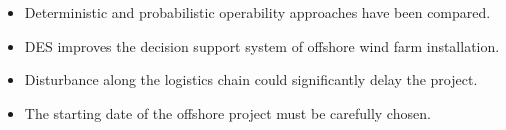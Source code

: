 \begin{highlights}
    \begin{itemize}
        \item Deterministic and probabilistic operability approaches have been compared.
        \item DES improves the decision support system of offshore wind farm installation.
        \item Disturbance along the logistics chain could significantly delay the project.
        \item The starting date of the offshore project must be carefully chosen.
    \end{itemize}
\end{highlights}